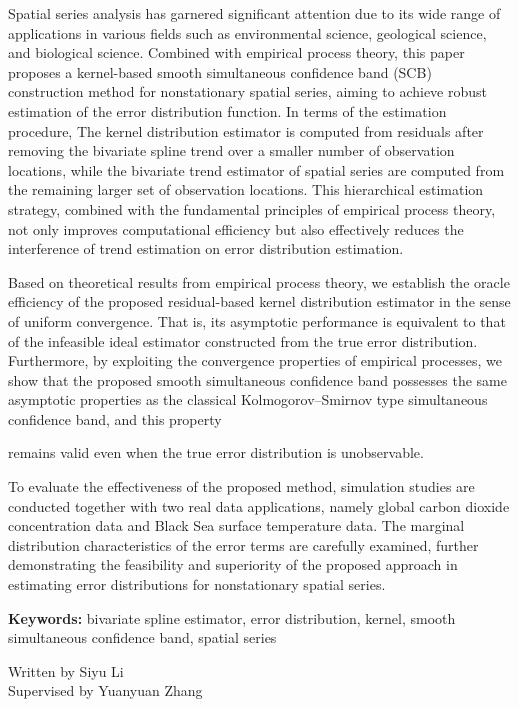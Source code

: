 Spatial series analysis has garnered significant attention due to its wide range of applications in various fields such as environmental science, geological science, and biological science. Combined with empirical process theory, this paper proposes a kernel-based smooth simultaneous confidence band (SCB) construction method for nonstationary spatial series, aiming to achieve robust estimation of the error distribution function. In terms of the estimation procedure, The kernel distribution estimator is computed from residuals after removing the bivariate spline trend over a smaller number of observation locations, while the bivariate trend estimator of spatial series are computed from the remaining larger
set of observation locations. This hierarchical estimation strategy, combined with the fundamental principles of empirical process theory, not only improves computational efficiency but also effectively reduces the interference of trend estimation on error distribution estimation.

Based on theoretical results from empirical process theory, we establish the oracle efficiency of the proposed residual-based kernel distribution estimator in the sense of uniform convergence. That is, its asymptotic performance is equivalent to that of the infeasible ideal estimator constructed from the true error distribution. Furthermore, by exploiting the convergence properties of empirical processes, we show that the proposed smooth simultaneous confidence band possesses the same asymptotic properties as the classical Kolmogorov--Smirnov type simultaneous confidence band, and this property 

\newpage %
\thispagestyle{fancy}
\noindent remains valid even when the true error distribution is unobservable.

To evaluate the effectiveness of the proposed method, simulation studies are conducted together with two real data applications, namely global carbon dioxide concentration data and Black Sea surface temperature data. The marginal distribution characteristics of the error terms are carefully examined, further demonstrating the feasibility and superiority of the proposed approach in estimating error distributions for nonstationary spatial series.

{\bf Keywords:} bivariate spline estimator, error distribution, kernel, smooth simultaneous confidence band, spatial series

\begin{flushright}
  Written by Siyu Li\\
Supervised by Yuanyuan Zhang
\end{flushright}



